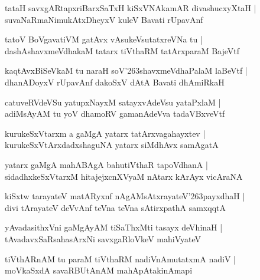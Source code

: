 \documentclass[twoside,12pt,openright]{book}
\def\S{\char'263}
\newcounter{shloka}[chapter]
\begin{document}
\begin{shloka}
tataH savxgARtapxriBarxSaTxH kiSxVNAkamAR divashucxyXtaH |\\
suvaNaRmaNimukAtxDheyxV kuleV Bavati rUpavAnf 
\end{shloka}

\begin{shloka}
tatoV BoVgavatiVM gatAvx vAsukeVsutatxreVNa tu |\\
dashAshavxmeVdhakaM tatarx tiVthaRM tatArxparaM BajeVtf 
\end{shloka}

\begin{shloka}
kaqtAvxBiSeVkaM tu naraH soV\S shavxmeVdhaPalaM laBeVtf |\\
dhanADoyxV rUpavAnf dakoSxV dAtA Bavati dhAmiRkaH 
\end{shloka}

\begin{shloka}
catuveRVdeVSu yatupxNayxM satayxvAdeVsu yataPxlaM |\\
adiMsAyAM tu yoV dhamoRV gamanAdeVva tadaVBxveVtf 
\end{shloka}

\begin{shloka}
kurukeSxVtarxm a gaMgA yatarx tatArxvagahayxtev |\\
kurukeSxVtArxdadxshaguNA yatarx siMdhAvx samAgatA 
\end{shloka}

\begin{shloka}
yatarx gaMgA mahABAgA bahutiVthaR tapoVdhanA |\\
sidadhxkeSxVtarxM hitajejxcnXVyaM nAtarx kArAyx vicAraNA 
\end{shloka}

\begin{shloka}
kiSxtw tarayateV matARyxnf nAgAMsAtxrayateV\S payxdhaH |\\
divi tArayateV deVvAnf teVna teVna sAtirxpathA samxqqtA
\end{shloka}

\begin{shloka}
yAvadasithxVni gaMgAyAM tiSaThxMti tasayx deVhinaH |\\
tAvadavxSaRsahasArxNi savxgaRloVkeV mahiVyateV 
\end{shloka}

\begin{shloka}
tiVthARnAM tu paraM tiVthaRM nadiVnAmutatxmA nadiV |\\
moVkaSxdA savaRBUtAnAM mahApAtakinAmapi
\end{shloka}
\end{document}
